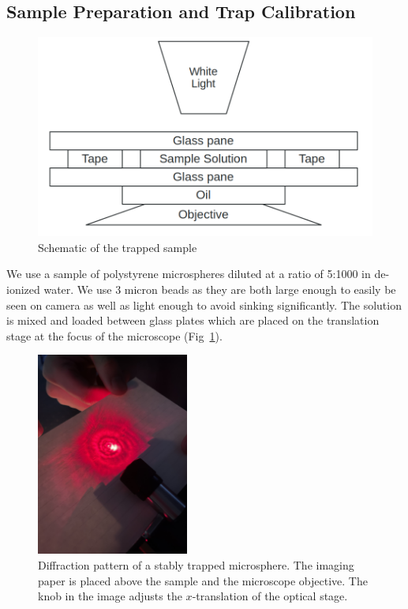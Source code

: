 \documentclass[aps,prb,twocolumn,superscriptaddress,floatfix,longbibliography,citeautoscript]{revtex4-2}
\begin{document}
\subsection{Sample Preparation and Trap Calibration}
\begin{figure}[H]
    \centering
    \includegraphics[width=1\linewidth]{Second_draft/figs/sample_figure.png}
    \caption{Schematic of the trapped sample}
    \label{fig:sample}
\end{figure}
We use a sample of polystyrene microspheres diluted at a ratio of 5:1000 in de-ionized water. We use 3 micron beads as they are both large enough to easily be seen on camera as well as light enough to avoid sinking significantly. The solution is mixed and loaded between glass plates which are placed on the translation stage at the focus of the microscope (Fig~\ref{fig:sample}). 
\begin{figure}
    \centering
    \includegraphics[width=5cm]{figs/diffraction.jpg}
    \caption{Diffraction pattern of a stably trapped microsphere. The imaging paper is placed above the sample and the microscope objective. The knob in the image adjusts the $x$-translation of the optical stage.}
    \label{fig:trapDiffractionPattern}
\end{figure}
\end{document}
